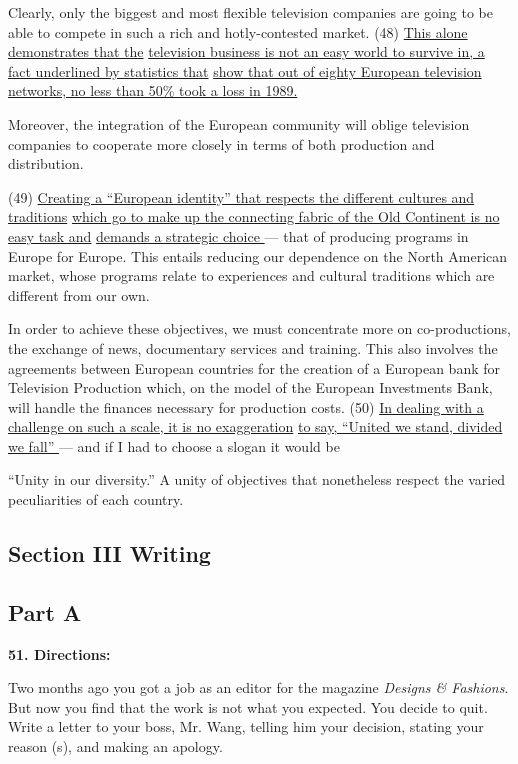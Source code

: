 \documentclass[UTF8,11pt]{ctexart}
\begin{document}
Clearly, only the biggest and most flexible television companies are going to be able to compete in such a rich and hotly-contested market. (48) \uline{This alone demonstrates that the} \uline{television business is not an easy world to survive in, a fact underlined by statistics that} \uline{show that out of eighty European television networks, no less than 50\% took a loss in 1989.}


Moreover, the integration of the European community will oblige television companies to cooperate more closely in terms of both production and distribution.


(49) \uline{Creating a “European identity” that respects the different cultures and traditions} \uline{which go to make up the connecting fabric of the Old Continent is no easy task and} \uline{demands a strategic choice }— that of producing programs in Europe for Europe. This entails reducing our dependence on the North American market, whose programs relate to experiences and cultural traditions which are different from our own.


In order to achieve these objectives, we must concentrate more on co-productions, the exchange of news, documentary services and training. This also involves the agreements between European countries for the creation of a European bank for Television Production which, on the model of the European Investments Bank, will handle the finances necessary for production costs. (50) \uline{In dealing with a challenge on such a scale, it is no exaggeration} \uline{to say, “United we stand, divided we fall” }— and if I had to choose a slogan it would be


“Unity in our diversity.” A unity of objectives that nonetheless respect the varied peculiarities of each country.


\subsection*{\textbf{Section III Writing}}


\subsection*{\textbf{Part A}}


\textbf{51. Directions:}


Two months ago you got a job as an editor for the magazine \textit{Designs \& Fashions}. But now you find that the work is not what you expected. You decide to quit. Write a letter to your boss, Mr. Wang, telling him your decision, stating your reason (s), and making an apology.
\end{document}

